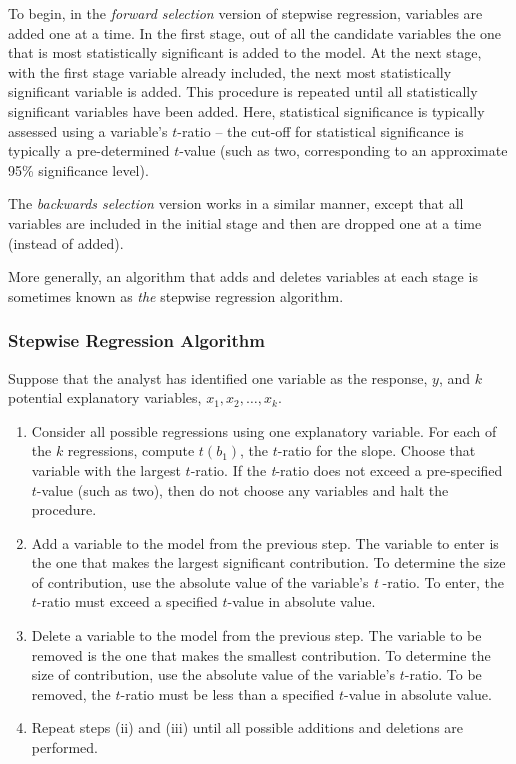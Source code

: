 To begin, in the \emph{forward selection} version of stepwise
regression, variables are added one at a time. In the first stage,
out of all the candidate variables the one that is most
statistically significant is added to the model. At the next stage,
with the first stage variable already included, the next most
statistically significant variable is added. This procedure is
repeated until all statistically significant variables have been
added. Here, statistical significance is typically assessed using a
variable's $t$-ratio -- the cut-off for statistical significance is
typically a pre-determined $t$-value (such as two, corresponding to
an approximate 95\% significance level).

The \emph{backwards selection} version works in a similar manner,
except that all variables are included in the initial stage and then
are dropped one at a time (instead of added).

More generally, an algorithm that adds and deletes variables at each
stage is sometimes known as \emph{the} stepwise regression
algorithm.



\bigskip

\boxedjed
\subsubsection*{Stepwise Regression Algorithm}

Suppose that the analyst has identified one variable as the
response, $y$, and $k$ potential explanatory variables, $x_1, x_2,
\ldots, x_k$.
\begin{enumerate}

\item Consider all possible regressions using one explanatory variable.
For each of the $k$ regressions, compute $t(b_1)$, the $t$-ratio for
the slope. Choose that variable with the largest $t$-ratio. If the
\textit{t}-ratio does not exceed a pre-specified $t$-value (such as
two), then do not choose any variables and halt the procedure.

\item Add a variable to the model from the previous step. The variable to enter
is the one that makes the largest significant contribution. To
determine the
size of contribution, use the absolute value of the variable's \textit{t}%
-ratio. To enter, the $t$-ratio must exceed a specified $t$-value in
absolute value.

\item Delete a variable to the model from the previous step. The variable to be
removed is the one that makes the smallest contribution. To
determine the size of contribution, use the absolute value of the
variable's $t$-ratio. To be removed, the $t$-ratio must be less than
a specified $t$-value in absolute value.

\item Repeat steps (ii) and (iii) until all possible additions and deletions are
performed.
\end{enumerate}

